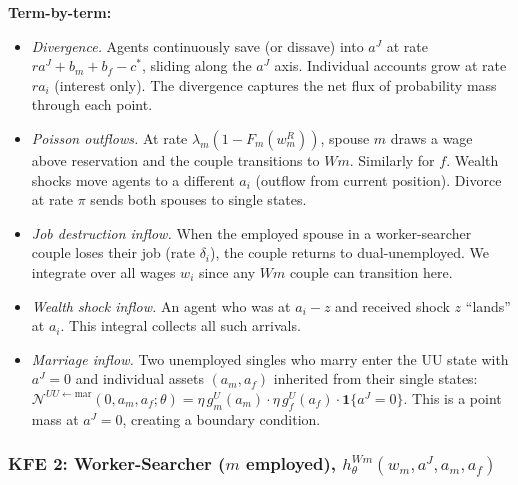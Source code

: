 \documentclass{article}
\begin{document}
\textbf{Term-by-term:}
\begin{itemize}
    \item[(i)] \textit{Divergence.} Agents continuously save (or dissave) into $a^J$ at rate $ra^J + b_m + b_f - c^*$, sliding along the $a^J$ axis. Individual accounts grow at rate $ra_i$ (interest only). The divergence captures the net flux of probability mass through each point.
    \item[(ii)] \textit{Poisson outflows.} At rate $\lambda_m(1-F_m(w_m^R))$, spouse $m$ draws a wage above reservation and the couple transitions to $Wm$. Similarly for $f$. Wealth shocks move agents to a different $a_i$ (outflow from current position). Divorce at rate $\pi$ sends both spouses to single states.
    \item[(iii)] \textit{Job destruction inflow.} When the employed spouse in a worker-searcher couple loses their job (rate $\delta_i$), the couple returns to dual-unemployed. We integrate over all wages $w_i$ since any $Wm$ couple can transition here.
    \item[(iv)] \textit{Wealth shock inflow.} An agent who was at $a_i - z$ and received shock $z$ ``lands'' at $a_i$. This integral collects all such arrivals.
    \item[(v)] \textit{Marriage inflow.} Two unemployed singles who marry enter the UU state with $a^J = 0$ and individual assets $(a_m, a_f)$ inherited from their single states: $\mathcal{N}^{UU\leftarrow\text{mar}}(0,a_m,a_f;\theta) = \eta\, g_m^U(a_m)\cdot\eta\, g_f^U(a_f)\cdot\mathbf{1}\{a^J = 0\}$. This is a point mass at $a^J = 0$, creating a boundary condition.
\end{itemize}

\subsubsection*{KFE 2: Worker-Searcher ($m$ employed), $h_\theta^{Wm}(w_m, a^J, a_m, a_f)$}
\end{document}
